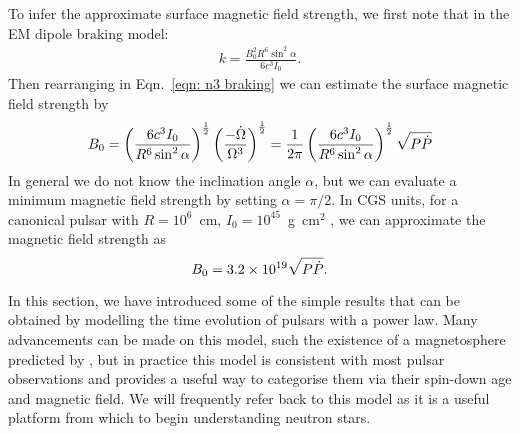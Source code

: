 To infer the approximate surface magnetic field strength, we first note that
in the EM dipole braking model:
\begin{align}
k = \frac{B_0^{2} R^{6} \sin^{2}\alpha}{6c^{3}I_0}.
\end{align}
Then rearranging in Eqn.~\eqref{eqn: n3 braking} we can estimate the surface
magnetic field strength by
\begin{equation}
    B_{0} = \left(\frac{6 c^{3} I_{0}}{R^{6} \sin^{2}\alpha}\right)^{\frac{1}{2}} 
            \left(\frac{-\dot{\Omega}}{\Omega^{3}}\right)^{\frac{1}{2}}
          = \frac{1}{2\pi}\left(\frac{6 c^{3} I_{0}}{R^{6} \sin^{2}\alpha}\right)^{\frac{1}{2}}
           \sqrt{P \dot{P}}
\label{eqn: surface magnetic field}
\end{equation}
In general we do not know the inclination angle $\alpha$, but we can evaluate a 
minimum magnetic field strength by setting $\alpha=\pi/2$. In CGS units, for a
canonical pulsar with $R=10^{6}$~cm, $I_{0}=10^{45}$~g~cm$^{2}$ \citep{Lyne2012book}, we can approximate
the magnetic field strength as
\begin{equation}
    B_{0} = 3.2 \times 10^{19} \sqrt{P \dot{P}}.
\label{eqn: surface magnetic field canonical}
\end{equation}

In this section, we have introduced some of the simple results that can be
obtained by modelling the time evolution of pulsars with a power law. Many
advancements can be made on this model, such the existence of a magnetosphere
predicted by \citet{Goldreich1969}, but in practice this model is consistent
with most pulsar observations and provides a useful way to categorise them via
their spin-down age and magnetic field. We will
frequently refer back to this model as it is a useful platform from which
to begin understanding neutron stars.

